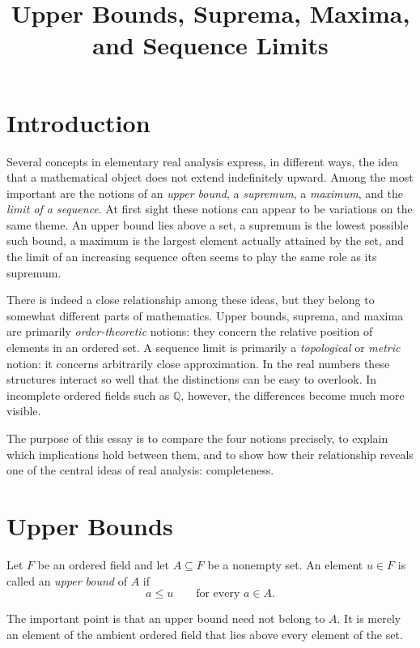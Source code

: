 \documentclass{essay}
\title{Upper Bounds, Suprema, Maxima, and Sequence Limits}
\author{}
\date{}
\begin{document}
\maketitle

\section{Introduction}

Several concepts in elementary real analysis express, in different ways, the idea that a mathematical object does not extend indefinitely upward. Among the most important are the notions of an \emph{upper bound}, a \emph{supremum}, a \emph{maximum}, and the \emph{limit of a sequence}. At first sight these notions can appear to be variations on the same theme. An upper bound lies above a set, a supremum is the lowest possible such bound, a maximum is the largest element actually attained by the set, and the limit of an increasing sequence often seems to play the same role as its supremum.

There is indeed a close relationship among these ideas, but they belong to somewhat different parts of mathematics. Upper bounds, suprema, and maxima are primarily \emph{order-theoretic} notions: they concern the relative position of elements in an ordered set. A sequence limit is primarily a \emph{topological} or \emph{metric} notion: it concerns arbitrarily close approximation. In the real numbers these structures interact so well that the distinctions can be easy to overlook. In incomplete ordered fields such as $\mathbb{Q}$, however, the differences become much more visible.

The purpose of this essay is to compare the four notions precisely, to explain which implications hold between them, and to show how their relationship reveals one of the central ideas of real analysis: completeness.

\section{Upper Bounds}

Let $F$ be an ordered field and let $A\subseteq F$ be a nonempty set. An element $u\in F$ is called an \emph{upper bound} of $A$ if
\[
    a\leq u
    \qquad\text{for every }a\in A.
\]

The important point is that an upper bound need not belong to $A$. It is merely an element of the ambient ordered field that lies above every element of the set.
\end{document}
